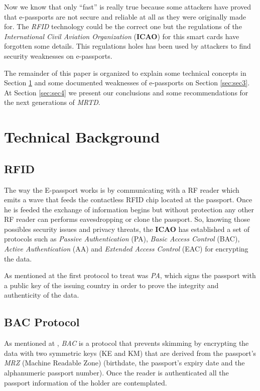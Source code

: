 \documentclass{acm_proc_article-sp}
\begin{document}
Now we know that only “fast” is really true because some attackers have proved that e-passports are not secure and reliable at all as they were originally made for. The \emph{RFID} technology could be the correct one but the regulations of the \emph{International Civil Aviation Organization }(\textbf{ICAO}) for this smart cards have forgotten some details. This regulations holes has been used by attackers to find security weaknesses on e-passports.

The remainder of this paper is organized to explain some technical concepts in Section \ref{sec:sec2} and some documented weaknesses of e-passports on Section \ref{sec:sec3}. At Section \ref{sec:sec4} we present our conclusions and some recommendations for the next generations of \emph{MRTD}. 

\section{Technical Background}
\label{sec:sec2}

\subsection{RFID}
The way the E-passport works is by communicating with a RF reader which emits a wave that feeds 
the contactless RFID chip located at the passport. Once he is feeded the exchange of information begins but 
without protection any other RF reader can performs eavesdropping or clone the passport. So, knowing those possibles security issues and privacy threats, the \textbf{ICAO} 
has 
established a set of protocols such as \textit{Passive Authentication} (PA), \textit{Basic Access Control} (BAC), 
\textit{Active Authentication} (AA) and \textit{Extended Access Control} (EAC) for encrypting the data.

As mentioned at \cite{NM12} the first protocol to treat was \textit{PA}, which signs the passport with 
a public key of the issuing country in order to prove the integrity and authenticity of the data.

\subsection{BAC Protocol}
As mentioned at \cite{CLPS07}, \textit{BAC} is a protocol that prevents skimming by encrypting 
the data with two symmetric keys (KE and KM) that are derived from the passport's  
\textit{MRZ} (Machine Readable Zone) (birthdate, the passport’s expiry date and the alphanumeric 
passport number). Once the reader is authenticated all the passport information of the holder are contemplated.
\end{document}
